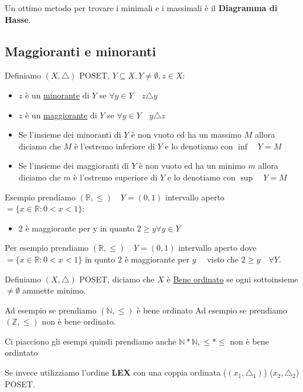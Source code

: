 \documentclass{article}
\begin{document}
Un ottimo metodo per trovare i minimali e i massimali è il \textbf{Diagramma di Hasse}. \par



\subsection{Maggioranti e minoranti}
Definiamo $(X, \triangle)$ POSET, $Y \subseteq X, Y \not = \emptyset, z \in X$:

\begin{itemize}
        \item $z$ è un \underline{minorante} di $Y$ se $\forall y \in Y \quad z \triangle y$
        \item $z$ è un \underline{maggiorante} di $Y$ se $\forall y \in Y \quad y \triangle z$

        \item Se l'insieme dei minoranti di $Y$ è non vuoto ed ha un massimo $M$ allora diciamo che $M$ è l'estremo inferiore di $Y$ e lo denotiamo con $\inf \quad  Y = M$
        \item Se l'insieme dei maggioranti di $Y$ è non vuoto ed ha un minimo $m$ allora diciamo che $m$ è l'estremo superiore di $Y$ e lo denotiamo con $\sup \quad  Y = M$
\end{itemize}

Esempio prendiamo $(\mathbb{R}, \le) \quad Y = (0,1)$ intervallo aperto $= \{x \in \mathbb{R} : 0 < x < 1\}$:
\begin{itemize}
        \item 2 è maggiorante per y in quanto $2 \ge y \forall y \in Y$
\end{itemize}

Per esempio prendiamo $(\mathbb{R}, \le) \quad Y = (0,1)$ intervallo aperto dove $ = \{x \in \mathbb{R} : 0 < x < 1\}$ in qunto $2$ è maggiorante per $y \quad $ visto che $2 \ge y \quad  \forall Y$.


Definiamo $(X, \triangle)$ POSET, diciamo che $X$ è \underline{Bene ordinato} se ogni sottoinsieme  $\not = \emptyset$ ammette minimo. \par
Ad esempio se prendiamo $(\mathbb{N}, \le)$ è bene ordinato
Ad esempio se prendiamo $(\mathbb{Z}, \le)$ non è bene ordinato. \par
Ci piacciono gli esempi quindi prendiamo anche $\mathbb{N}*\mathbb{N}, \le * \le  $ non è bene ordintato \par
Se invece utilizziamo l'ordine \textbf{LEX} con una coppia ordinata ($(x_1,\triangle_1)$) ($x_2,\triangle_2$) POSET.\newline
\end{document}
